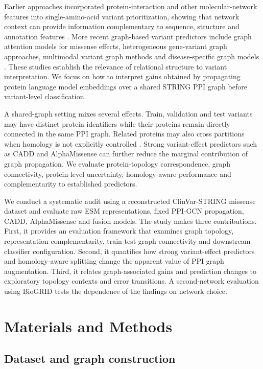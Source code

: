 \documentclass[conference]{IEEEtran}
\begin{document}
Earlier approaches incorporated protein-interaction and other molecular-network features into single-amino-acid variant prioritization, showing that network context can provide information complementary to sequence, structure and annotation features \cite{Yates2014SuSPect,Ozturk2022NetworkFeatures}. More recent graph-based variant predictors include graph attention models for missense effects, heterogeneous gene-variant graph approaches, multimodal variant graph methods and disease-specific graph models \cite{Zhang2022gMVP,Cheng2021VEGN,Yu2025GNNMAP,Ghadie2025DiseaseSpecificGNN}. These studies establish the relevance of relational structure to variant interpretation. We focus on how to interpret gains obtained by propagating protein language model embeddings over a shared STRING PPI graph before variant-level classification.

A shared-graph setting mixes several effects. Train, validation and test variants may have distinct protein identifiers while their proteins remain directly connected in the same PPI graph. Related proteins may also cross partitions when homology is not explicitly controlled \cite{Littmann2022ProteinMLTips,Teufel2023GraphPart}. Strong variant-effect predictors such as CADD and AlphaMissense can further reduce the marginal contribution of graph propagation. We evaluate protein-topology correspondence, graph connectivity, protein-level uncertainty, homology-aware performance and complementarity to established predictors.

We conduct a systematic audit using a reconstructed ClinVar-STRING missense dataset and evaluate raw ESM representations, fixed PPI-GCN propagation, CADD, AlphaMissense and fusion models. The study makes three contributions. First, it provides an evaluation framework that examines graph topology, representation complementarity, train-test graph connectivity and downstream classifier configuration. Second, it quantifies how strong variant-effect predictors and homology-aware splitting change the apparent value of PPI graph augmentation. Third, it relates graph-associated gains and prediction changes to exploratory topology contexts and error transitions. A second-network evaluation using BioGRID tests the dependence of the findings on network choice.

\section{Materials and Methods}

\subsection{Dataset and graph construction}
\end{document}
